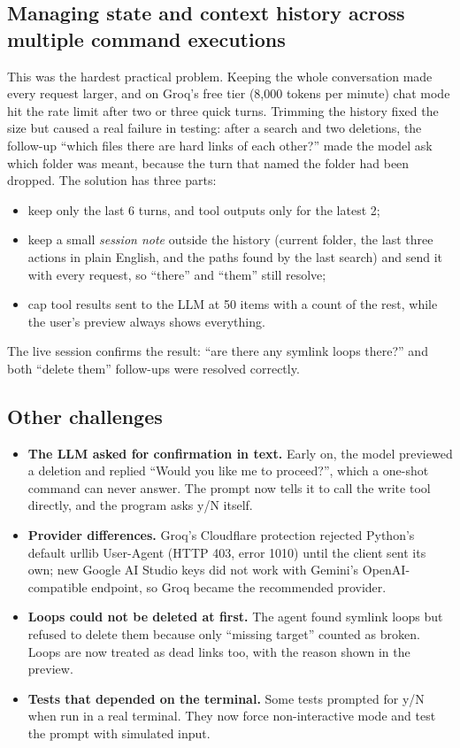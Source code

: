\documentclass[12pt,a4paper]{article}
\DeclareRobustCommand{\code}[1]{{\ttfamily\renewcommand{\_}{\textunderscore\allowbreak}#1}}
\begin{document}
\subsection{Managing state and context history across multiple command executions}
This was the hardest practical problem. Keeping the whole conversation made every request
larger, and on Groq's free tier (8,000 tokens per minute) chat mode hit the rate limit after two
or three quick turns. Trimming the history fixed the size but caused a real failure in testing:
after a search and two deletions, the follow-up ``which files there are hard links of each
other?'' made the model ask which folder was meant, because the turn that named the folder had
been dropped. The solution has three parts:
\begin{itemize}
  \item keep only the last 6 turns, and tool outputs only for the latest 2;
  \item keep a small \emph{session note} outside the history (current folder, the last three
        actions in plain English, and the paths found by the last search) and send it with every
        request, so ``there'' and ``them'' still resolve;
  \item cap tool results sent to the LLM at 50 items with a count of the rest, while the user's
        preview always shows everything.
\end{itemize}
The live session confirms the result: ``are there any symlink loops there?'' and both
``delete them'' follow-ups were resolved correctly.

\subsection{Other challenges}
\begin{itemize}
  \item \textbf{The LLM asked for confirmation in text.} Early on, the model previewed a deletion
        and replied ``Would you like me to proceed?'', which a one-shot command can never answer.
        The prompt now tells it to call the write tool directly, and the program asks y/N itself.
  \item \textbf{Provider differences.} Groq's Cloudflare protection rejected Python's default
        \code{urllib} User-Agent (HTTP 403, error 1010) until the client sent its own; new Google AI
        Studio keys did not work with Gemini's OpenAI-compatible endpoint, so Groq became the
        recommended provider.
  \item \textbf{Loops could not be deleted at first.} The agent found symlink loops but refused to
        delete them because only ``missing target'' counted as broken. Loops are now treated as
        dead links too, with the reason shown in the preview.
  \item \textbf{Tests that depended on the terminal.} Some tests prompted for y/N when run in a
        real terminal. They now force non-interactive mode and test the prompt with simulated input.
\end{itemize}
\end{document}
